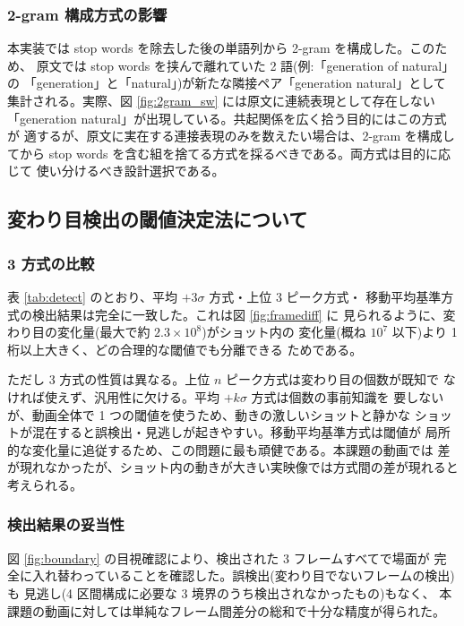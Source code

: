 \subsubsection{2-gram 構成方式の影響}

本実装では stop words を除去した後の単語列から 2-gram を構成した。このため、
原文では stop words を挟んで離れていた 2 語(例:「generation of natural」の
「generation」と「natural」)が新たな隣接ペア「generation natural」として
集計される。実際、図 \ref{fig:2gram_sw} には原文に連続表現として存在しない
「generation natural」が出現している。共起関係を広く拾う目的にはこの方式が
適するが、原文に実在する連接表現のみを数えたい場合は、2-gram を構成してから
stop words を含む組を捨てる方式を採るべきである。両方式は目的に応じて
使い分けるべき設計選択である。

\subsection{変わり目検出の閾値決定法について}

\subsubsection{3 方式の比較}

表 \ref{tab:detect} のとおり、平均 $+3\sigma$ 方式・上位 3 ピーク方式・
移動平均基準方式の検出結果は完全に一致した。これは図 \ref{fig:framediff} に
見られるように、変わり目の変化量(最大で約 $2.3 \times 10^8$)がショット内の
変化量(概ね $10^7$ 以下)より 1 桁以上大きく、どの合理的な閾値でも分離できる
ためである。

ただし 3 方式の性質は異なる。上位 $n$ ピーク方式は変わり目の個数が既知で
なければ使えず、汎用性に欠ける。平均 $+k\sigma$ 方式は個数の事前知識を
要しないが、動画全体で 1 つの閾値を使うため、動きの激しいショットと静かな
ショットが混在すると誤検出・見逃しが起きやすい。移動平均基準方式は閾値が
局所的な変化量に追従するため、この問題に最も頑健である。本課題の動画では
差が現れなかったが、ショット内の動きが大きい実映像では方式間の差が現れると
考えられる。

\subsubsection{検出結果の妥当性}

図 \ref{fig:boundary} の目視確認により、検出された 3 フレームすべてで場面が
完全に入れ替わっていることを確認した。誤検出(変わり目でないフレームの検出)も
見逃し(4 区間構成に必要な 3 境界のうち検出されなかったもの)もなく、
本課題の動画に対しては単純なフレーム間差分の総和で十分な精度が得られた。

